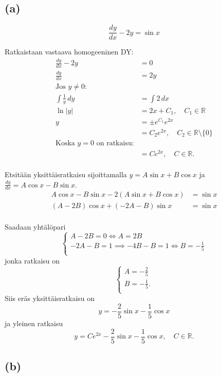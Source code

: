\documentclass{article}
\begin{document}
\subsection*{(a)}

\[
  \frac{dy}{dx} - 2y = \sin x
\]

Ratkaistaan vastaava homogeeninen DY:
\begin{align*}
  \frac{dy}{dx} - 2y &= 0 \\
  \frac{dy}{dx} &= 2y \\
  \text{Jos $y \neq 0$:} \\
  \int \frac{1}{y} \,dy &= \int 2 \,dx \\
  \ln |y| &= 2x + C_1, \quad C_1 \in \mathbb{R} \\
  y &= \pm e^{C_1} e^{2x} \\
    &= C_2 e^{2x}, \quad C_2 \in \mathbb{R} \setminus \{0\} \\
  \text{Koska $y = 0$ on ratkaisu:} \\
    &= Ce^{2x}, \quad C \in \mathbb{R}. \\
\end{align*}

Etsitään yksittäisratkaisu sijoittamalla $y = A \sin x + B \cos x$
ja $\frac{dy}{dx} = A \cos x - B \sin x$.
\begin{align*}
  A \cos x - B \sin x - 2(A \sin x + B \cos x) &= \sin x \\
  (A - 2B) \cos x + (-2A - B) \sin x &= \sin x \\
\end{align*}

Saadaan yhtälöpari
\[
  \begin{cases}
    A - 2B = 0 \iff A = 2B \\
    -2A - B = 1 \implies -4B - B = 1 \iff B = -\frac{1}{5} \\
  \end{cases}
\]
jonka ratkaisu on
\[
  \begin{cases}
    A = -\frac{2}{5} \\
    B = -\frac{1}{5}. \\
  \end{cases}
\]
Siis eräs yksittäisratkaisu on
\[
  y = -\frac{2}{5} \sin x - \frac{1}{5} \cos x
\]
ja yleinen ratkaisu
\[
  y = Ce^{2x} - \frac{2}{5} \sin x - \frac{1}{5} \cos x, \quad C \in \mathbb{R}.
\]

\subsection*{(b)}
\end{document}
